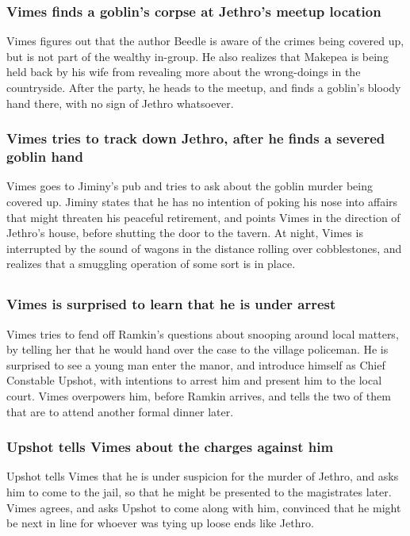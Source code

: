 \subsubsection{\Gls{Vimes} finds a goblin's corpse at \Gls{Jethro}'s meetup location}
\Gls{Vimes} figures out that the author \Gls{Beedle} is aware of the crimes being covered up, but
is not part of the wealthy in-group. He also realizes that \Gls{Makepea} is being held back by his
wife from revealing more about the wrong-doings in the countryside. After the party, he heads to the
meetup, and finds a goblin's bloody hand there, with no sign of \Gls{Jethro} whatsoever.

\subsubsection{\Gls{Vimes} tries to track down \Gls{Jethro}, after he finds a severed goblin hand}
\Gls{Vimes} goes to \Gls{Jiminy}'s pub and tries to ask about the goblin murder being covered up.
\Gls{Jiminy} states that he has no intention of poking his nose into affairs that might threaten
his peaceful retirement, and points \Gls{Vimes} in the direction of \Gls{Jethro}'s house, before
shutting the door to the tavern. At night, \Gls{Vimes} is interrupted by the sound of wagons in the
distance rolling over cobblestones, and realizes that a smuggling operation of some sort is in
place.

\subsection{}
\subsubsection{\Gls{Vimes} is surprised to learn that he is under arrest}
\Gls{Vimes} tries to fend off \Gls{Ramkin}'s questions about snooping around local matters, by
telling her that he would hand over the case to the village policeman. He is surprised to see a
young man enter the manor, and introduce himself as Chief Constable \Gls{Upshot}, with intentions to
arrest him and present him to the local court. \Gls{Vimes} overpowers him, before \Gls{Ramkin}
arrives, and tells the two of them that are to attend another formal dinner later.

\subsubsection{\Gls{Upshot} tells \Gls{Vimes} about the charges against him}
\Gls{Upshot} tells \Gls{Vimes} that he is under suspicion for the murder of \Gls{Jethro}, and asks
him to come to the jail, so that he might be presented to the magistrates later. \Gls{Vimes}
agrees, and asks \Gls{Upshot} to come along with him, convinced that he might be next in line for
whoever was tying up loose ends like \Gls{Jethro}.

